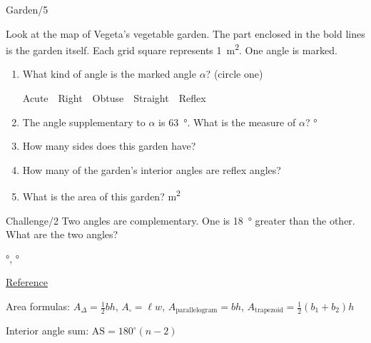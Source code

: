 \documentclass[12pt,letterpaper]{article}
\begin{document}
\begin{problem}{Garden\hfill/5}
  \begin{center}
  \end{center}

 Look at the map of Vegeta's vegetable garden. The part enclosed in the bold
 lines is the garden itself. Each grid square represents \SI{1}{\meter^2}. One
 angle is marked.

 \begin{enumerate}
  \item What kind of angle is the marked angle \(\alpha\)? (circle one)

  \hfill Acute~~Right~~Obtuse~~Straight~~Reflex

  \item The angle supplementary to \(\alpha\) is \SI{63}{\degree}. What is the
  measure of \(\alpha\)?
  \hfill \blankC \si{\degree}

  \item How many sides does this garden have? \hfill \blankC

  \item How many of the garden's interior angles are reflex angles?
  \hfill \blankC

  \item What is the area of this garden? \hfill \blankC \si{\meter^2}
\end{enumerate}

\end{problem}

\begin{problem}{Challenge\hfill/2}
 Two angles are complementary. One is \SI{18}{\degree} greater than the other.
 What are the two angles?

 \hfill \blankC \si{\degree}, \blankC \si{\degree}
\end{problem}

\vspace{1em}\noindent\underline{Reference}

\noindent Area formulas: $A_\Delta=\frac{1}{2}bh$, $A_\square=\ell w$,
$A_\text{parallelogram}=bh$,
$A_\text{trapezoid}=\frac{1}{2}\left(b_1+b_2\right)h$

\noindent Interior angle sum: $\mathrm{AS}=180^\circ (n-2)$
\end{document}
